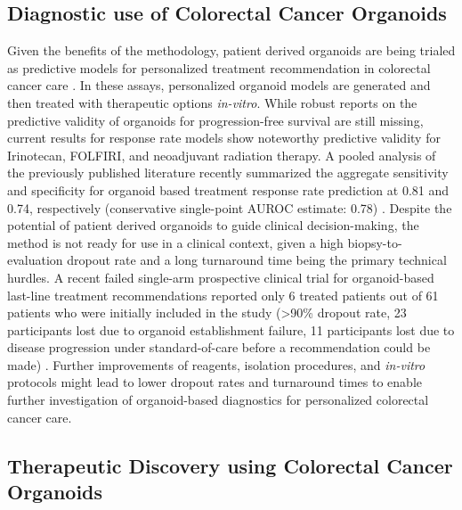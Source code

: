 \begin{flushleft}
\subsection{Diagnostic use of Colorectal Cancer Organoids}

Given the benefits of the methodology, patient derived organoids are being trialed as predictive models for personalized treatment recommendation in colorectal cancer care \parencite{vandeweteringProspectiveDerivationLiving2015, vlachogiannisPatientderivedOrganoidsModel2018, ganeshRectalCancerOrganoid2019, ooftPatientderivedOrganoidsCan2019, yaoPatientDerivedOrganoidsPredict2020a}. In these assays, personalized organoid models are generated and then treated with therapeutic options \textit{in-vitro}. While robust reports on the predictive validity of organoids for progression-free survival are still missing, current results for response rate models show noteworthy predictive validity for Irinotecan, FOLFIRI, and neoadjuvant radiation therapy. A pooled analysis of the previously published literature recently summarized the aggregate sensitivity and specificity for organoid based treatment response rate prediction at 0.81 and 0.74, respectively (conservative single-point AUROC estimate: 0.78) \parencite{wensinkPatientderivedOrganoidsPredictive2021, zhangNoteROCAnalysis2005}. Despite the potential of patient derived organoids to guide clinical decision-making, the method is not ready for use in a clinical context, given a high biopsy-to-evaluation dropout rate and a long turnaround time being the primary technical hurdles. A recent failed single-arm prospective clinical trial for organoid-based last-line treatment recommendations reported only 6 treated patients out of 61 patients who were initially included in the study (>90\% dropout rate, 23 participants lost due to organoid establishment failure, 11 participants lost due to disease progression under standard-of-care before a recommendation could be made) \parencite{ooftProspectiveExperimentalTreatment2021}. Further improvements of reagents, isolation procedures, and \textit{in-vitro} protocols might lead to lower dropout rates and turnaround times to enable further investigation of organoid-based diagnostics for personalized colorectal cancer care. \par

\subsection{Therapeutic Discovery using Colorectal Cancer Organoids} 


\end{flushleft}
